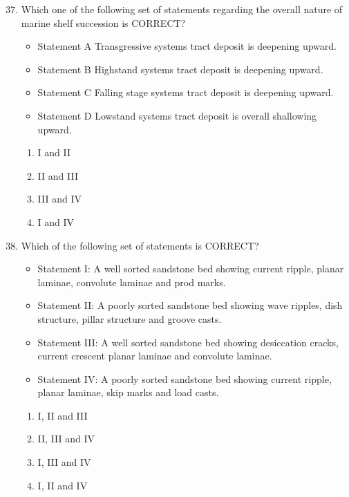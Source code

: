 \documentclass[journal,12pt,onecolumn]{IEEEtran}
\theoremstyle{remark}
\begin{document}
\begin{enumerate}
\setcounter{enumi}{36}

\item Which one of the following set of statements regarding the overall nature of marine shelf succession is CORRECT?  



\begin{itemize}
  \item Statement A Transgressive systems tract deposit is deepening upward.
  \item Statement B Highstand systems tract deposit is deepening upward.
  \item Statement C Falling stage systems tract deposit is deepening upward.
  \item Statement D Lowstand systems tract deposit is overall shallowing upward.
\end{itemize}

\begin{enumerate}
\item I and II
\item II and III
\item III and IV
\item I and IV
\end{enumerate}

\item Which of the following set of statements is CORRECT?  \begin{itemize}
\item Statement I: A well sorted sandstone bed showing current ripple, planar laminae, convolute laminae and prod marks. 
\item Statement II: A poorly sorted sandstone bed showing wave ripples, dish structure, pillar structure and groove casts.  
\item Statement III: A well sorted sandstone bed showing desiccation cracks, current crescent planar laminae and convolute laminae.  
\item Statement IV: A poorly sorted sandstone bed showing current ripple, planar laminae, skip marks and load casts.
\end{itemize}

\begin{multicols}{2}
\begin{enumerate}
\item I, II and III
\item II, III and IV
\item I, III and IV
\item I, II and IV
\end{enumerate}
\end{multicols}


\end{enumerate}
\end{document}
